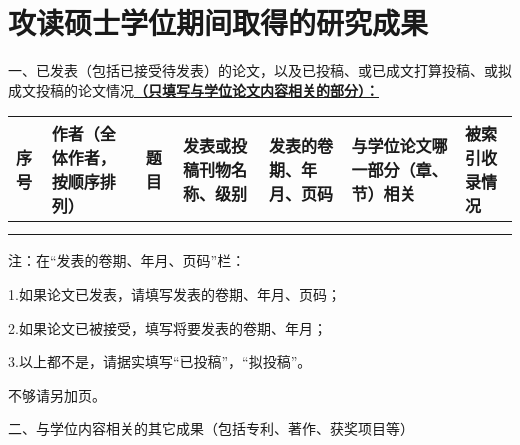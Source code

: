 \chapter{攻读硕士学位期间取得的研究成果} %
\pubfont %
一、已发表（包括已接受待发表）的论文，以及已投稿、或已成文打算投稿、或拟成文投稿的论文情况\underline{\textbf{（只填写与学位论文内容相关的部分）：}}
\begin{table}
	\centering{}%
	\pubfont 
	\begin{longtable}{|>{\centering}m{0.5cm}|m{1.8cm}|>{\centering}m{2.8cm}|>{\centering}m{2.5cm}|>{\centering}m{2.2cm}|>{\centering}m{}|>{\centering}m{1cm}|}
		\hline 
		\textbf{序号} & \textbf{作者（全体作者，按顺序排列）} & \textbf{题 目} 						   & \textbf{发表或投稿刊物名称、级别} & \textbf{发表的卷期、年月、页码} & \textbf{与学位论文哪一部分（章、节）相关} &\textbf{被索引收录情况}\tabularnewline
		\hline 
		1    & 					  &  &  &  &  &  \tabularnewline
		\hline 
		2	 & 							&  	 &   &  &  & \tabularnewline
		\hline 
	\end{longtable}
\end{table}

注：在“发表的卷期、年月、页码”栏：

1.如果论文已发表，请填写发表的卷期、年月、页码；

2.如果论文已被接受，填写将要发表的卷期、年月；

3.以上都不是，请据实填写“已投稿”，“拟投稿”。

不够请另加页。

二、与学位内容相关的其它成果（包括专利、著作、获奖项目等）




\normalsize %